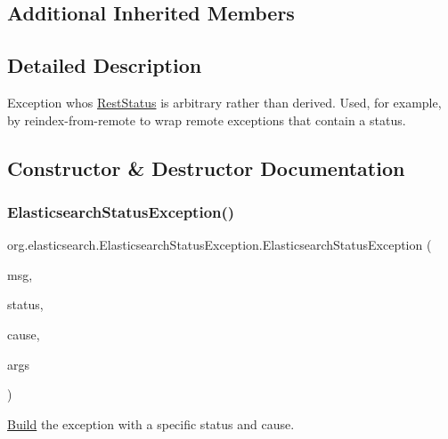 \subsection*{Additional Inherited Members}


\subsection{Detailed Description}
Exception who\textquotesingle{}s \hyperlink{}{Rest\+Status} is arbitrary rather than derived. Used, for example, by reindex-\/from-\/remote to wrap remote exceptions that contain a status. 

\subsection{Constructor \& Destructor Documentation}
\hypertarget{classorg_1_1elasticsearch_1_1_elasticsearch_status_exception_a0e75cb4029aa054eb09e2fb524989c98}{}\label{classorg_1_1elasticsearch_1_1_elasticsearch_status_exception_a0e75cb4029aa054eb09e2fb524989c98} 
\subsubsection{\texorpdfstring{Elasticsearch\+Status\+Exception()}{ElasticsearchStatusException()}\hspace{0.1cm}{\footnotesize\ttfamily [1/3]}}
{\footnotesize\ttfamily org.\+elasticsearch.\+Elasticsearch\+Status\+Exception.\+Elasticsearch\+Status\+Exception (\begin{DoxyParamCaption}\item[{String}]{msg,  }\item[{Rest\+Status}]{status,  }\item[{Throwable}]{cause,  }\item[{Object...}]{args }\end{DoxyParamCaption})}

\hyperlink{classorg_1_1elasticsearch_1_1_build}{Build} the exception with a specific status and cause. \hypertarget{classorg_1_1elasticsearch_1_1_elasticsearch_status_exception_a8a059a544162d4a87a4808fc346e5f1e}{}\label{classorg_1_1elasticsearch_1_1_elasticsearch_status_exception_a8a059a544162d4a87a4808fc346e5f1e} 
